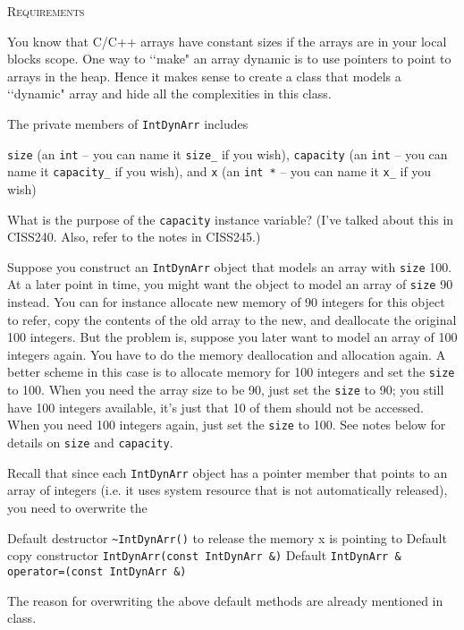 \textsc{Requirements}

You know that C/C++ arrays have constant sizes if the 
arrays are in your local blocks scope. One way to 
\lq\lq make" an array dynamic is to use pointers to point 
to arrays in the heap. Hence it makes sense to create a 
class that models a \lq\lq dynamic" array and hide all 
the complexities in this class. 

The private members of \verb!IntDynArr! includes 
\begin{tightlist}
\li \verb!size! (an \verb!int! -- you can name it \verb!size_! if you wish), 
\li \verb!capacity! (an \verb!int! -- you can name it \verb!capacity_! if you wish), and
\li \verb!x! (an \verb!int *! -- you can name it \verb!x_! if you wish)
\end{tightlist}

What is the purpose of the \verb!capacity! instance variable? 
(I've talked about this in CISS240. Also, refer to the notes 
in CISS245.)

Suppose you construct an \verb!IntDynArr! object that models 
an array with \verb!size! 100. At a later point in time, you might 
want the object to model an array of \verb!size! 90 instead. You 
can for instance allocate new memory of 90 integers for this 
object to refer, copy the contents of the old array to the 
new, and deallocate the original 100 integers. But the 
problem is, suppose you later want to model an array of 100 
integers again. You have to do the memory deallocation and 
allocation again. A better scheme in this case is to allocate 
memory for 100 integers and set the \verb!size! to 100. When you need 
the array size to be 90, just set the \verb!size! to 90; you still have 
100 integers available, it's just that 10 of them should not be 
accessed. When you need 100 integers again, just set the \verb!size! to 
100. See notes below for details on \verb!size! and \verb!capacity!.

Recall that since each \verb!IntDynArr! object has a pointer member that 
points to an array of integers (i.e. it uses system resource that is not 
automatically released), you need to overwrite the 
\begin{tightlist}
\li Default destructor \verb!~IntDynArr()! to release the memory x is 
pointing to
\li Default copy constructor \verb!IntDynArr(const IntDynArr &)!
\li Default \verb!IntDynArr & operator=(const IntDynArr &)!
\end{tightlist}
The reason for overwriting the above default methods are already 
mentioned in class.

